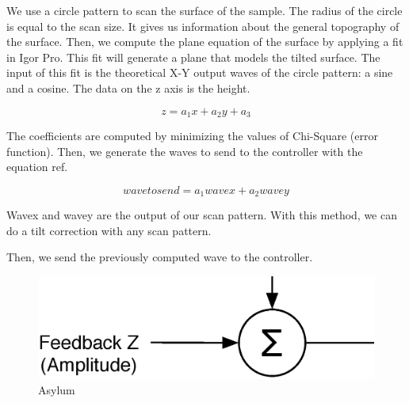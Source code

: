 We use a circle pattern to scan the surface of the sample. The radius of the circle is equal to the scan size. It gives us information about the general topography of the surface. Then, we compute the plane equation of the surface by applying a fit in Igor Pro. This fit will generate a plane that models the tilted surface. The input of this fit is the theoretical X-Y output waves of the circle pattern: a sine and a cosine. The data on the z axis is the height.

\begin{equation}\label{eqn:planeeq}
z = a_1 x + a_2 y + a_3 
\end{equation}

The coefficients are computed by minimizing the values of Chi-Square (error function). Then, we generate the waves to send to the controller with the equation ref.

\begin{equation}\label{eqn:sendwave}
wavetosend = a_1 wavex + a_2 wavey 
\end{equation}

Wavex and wavey are the output of our scan pattern. With this method, we can do a tilt correction with any scan pattern.

Then, we send the previously computed wave to the controller.

\begin{figure}[H]
  \centering
  \includegraphics[scale=0.4]{images/outputz.eps}
    \caption{Asylum}
  \label{outputz}
\end{figure}